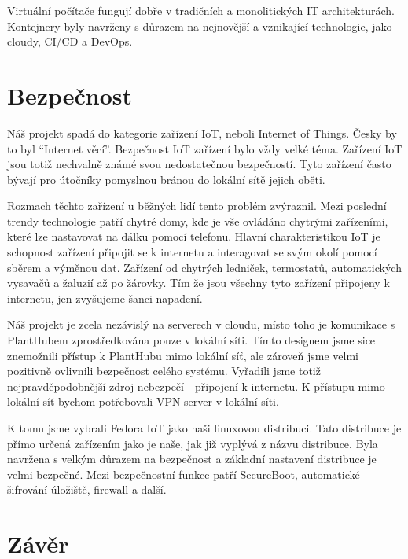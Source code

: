 \documentclass[czech,12pt,a4paper]{article}
\begin{document}
Virtuální počítače fungují dobře v tradičních a monolitických IT architekturách. Kontejnery byly navrženy s důrazem na nejnovější a vznikající technologie, jako cloudy, CI/CD a DevOps.

\section{Bezpečnost}

Náš projekt spadá do kategorie zařízení IoT, neboli Internet of Things. Česky by to byl \enquote{Internet věcí}. Bezpečnost IoT zařízení bylo vždy velké téma. Zařízení IoT jsou totiž nechvalně známé svou nedostatečnou bezpečností. Tyto zařízení často bývají pro útočníky pomyslnou bránou do lokální sítě jejich oběti.

Rozmach těchto zařízení u běžných lidí tento problém zvýraznil. Mezi poslední trendy technologie patří chytré domy, kde je vše ovládáno chytrými zařízeními, které lze nastavovat na dálku pomocí telefonu. Hlavní charakteristikou IoT je schopnost zařízení připojit se k internetu a interagovat se svým okolí pomocí sběrem a výměnou dat. Zařízení od chytrých ledniček, termostatů, automatických vysavačů a žaluzií až po žárovky. Tím že jsou všechny tyto zařízení připojeny k internetu, jen zvyšujeme šanci napadení.


Náš projekt je zcela nezávislý na serverech v cloudu, místo toho je komunikace s PlantHubem zprostředkována pouze v lokální síti. Tímto designem jsme sice znemožnili přístup k PlantHubu mimo lokální síť, ale zároveň jsme velmi pozitivně ovlivnili bezpečnost celého systému. Vyřadili jsme totiž nejpravděpodobnější zdroj nebezpečí - připojení k internetu. K přístupu mimo lokální síť bychom potřebovali VPN server v lokální síti.

K tomu jsme vybrali Fedora IoT jako naši linuxovou distribuci. Tato distribuce je přímo určená zařízením jako je naše, jak již vyplývá z názvu distribuce. Byla navržena s velkým důrazem na bezpečnost a základní nastavení distribuce je velmi bezpečné. Mezi bezpečnostní funkce patří SecureBoot, automatické šifrování úložiště, firewall a další.

\clearpage

\section{Závěr}
\end{document}
